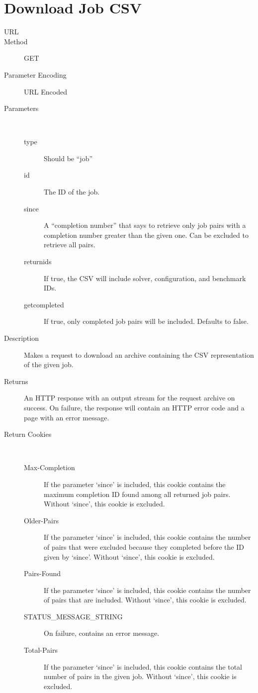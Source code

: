 \section{Download Job CSV}
\begin{description}
\item [URL] 
\item [Method] GET
\item [Parameter Encoding] URL Encoded
\item [Parameters] \
	\begin{description}
	\item [type]  Should be “job”
	\item [id]  The ID of the job.
	\item [since] \type{Integer} A “completion number” that says to retrieve only job pairs with a completion number greater than the given one. Can be excluded to retrieve all pairs.
	\item [returnids]  If true, the CSV will include solver, configuration, and benchmark IDs.
	\item [getcompleted] \type{Boolean} If true, only completed job pairs will be included. Defaults to false.
	\end{description}
\item [Description] Makes a request to download an archive containing the CSV representation of the given job.
\item [Returns] An HTTP response with an output stream for the request archive on success. On failure, the response will contain an HTTP error code and a page with an error message.
\item [Return Cookies] \
	\begin{description}
	\item [Max-Completion]  If the parameter ‘since’ is included, this cookie contains the maximum completion ID found among all returned job pairs. Without ‘since’, this cookie is excluded.
	\item [Older-Pairs]  If the parameter ‘since’ is included, this cookie contains the number of pairs that were excluded because they completed before the ID given by ‘since’. Without ‘since’, this cookie is excluded.
	\item [Pairs-Found]  If the parameter ‘since’ is included, this cookie contains the number of pairs that are included. Without ‘since’, this cookie is excluded.
	\item [STATUS\_MESSAGE\_STRING] \type{String} On failure, contains an error message.
	\item [Total-Pairs] \type{Integer} If the parameter ‘since’ is included, this cookie contains the total number of pairs in the given job. Without ‘since’, this cookie is excluded.
	\end{description}
\end{description}


